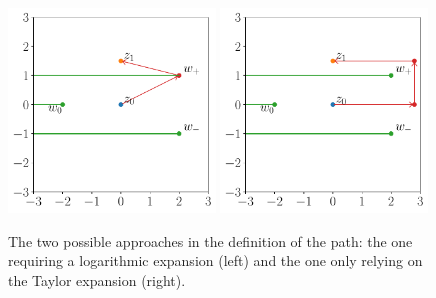 \begin{figure}[t]
\includegraphics[width=0.49\textwidth]{Images/path_log.pdf}
\includegraphics[width=0.49\textwidth]{Images/path_taylor.pdf}
\caption{\label{fig:path_logVStaylor}
 The two possible approaches in the definition of the path: the one requiring a logarithmic expansion (left) and the one only relying on the Taylor expansion (right).}
\end{figure}

